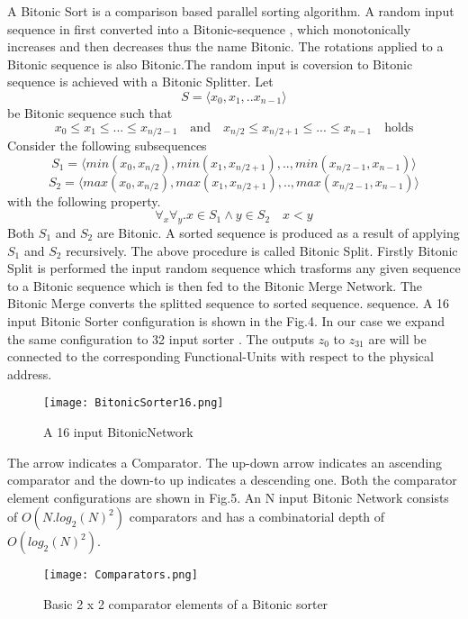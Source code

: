 			    A Bitonic Sort\cite{bitonic_ref} is a comparison based parallel sorting algorithm. A random input sequence in first converted into a Bitonic-sequence , which monotonically increases and then decreases thus the name Bitonic.
			    The rotations applied to a Bitonic sequence is also Bitonic.The random input is coversion to Bitonic sequence is achieved with a Bitonic Splitter.\newline
			    Let \[ 
				  S = \langle x_0,x_1,..x_{n-1}\rangle 
				\] be Bitonic sequence such that
				\[
				    x_0 \leq x_1 \leq ... \leq x_{n/2-1} \quad \textrm{and} \quad  x_{n/2} \leq x_{n/2+1} \leq ... \leq x_{n-1}  \quad \textrm{holds}
				\]
			    Consider the following subsequences
				\[
				  S_{1} =  \langle min(x_0,x_{n/2}), min(x_1,x_{n/2+1}),..,min(x_{n/2-1},x_{n-1})\rangle
				\]
				\[
				  S_{2} =  \langle max(x_0,x_{n/2}), max(x_1,x_{n/2+1}),..,max(x_{n/2-1},x_{n-1})\rangle
				\]
			    with the following property.
				\[
				  \forall _{x} \forall _{y}. x \in S_{1}  \wedge  y \in S_{2} \quad x < y
				\]
			    Both $S_{1}$ and $S_{2}$ are Bitonic. A sorted sequence is produced as a result of applying $S_{1}$ and $S_{2}$ recursively. The above procedure is called Bitonic Split. Firstly Bitonic Split is performed the input random sequence which 
			    trasforms any given sequence to a Bitonic sequence which is then fed to the Bitonic Merge Network. The Bitonic Merge converts the splitted sequence to sorted sequence.
			    sequence. A 16 input Bitonic Sorter configuration is shown in the Fig.4. In our case we expand the same configuration to 32 input sorter . The outputs $z_{0}$ to $z_{31}$ are will
			    be connected to the corresponding Functional-Units with respect to the physical address.
				    \begin{figure}[!ht]
					      \texttt{[image: BitonicSorter16.png]}
					    \caption{A 16 input BitonicNetwork}
				    \end{figure}
			    The arrow indicates a Comparator. The up-down arrow indicates an ascending comparator and the down-to up indicates a descending one. Both the comparator element configurations are shown in Fig.5. An N input Bitonic Network
			    consists of $O(N.log_{2}(N)^{2})$ comparators and has a combinatorial depth of $O(log_{2}(N)^{2})$.
				    \begin{figure}[!ht]
					      \texttt{[image: Comparators.png]}
					    \caption{Basic 2 x 2 comparator elements of a Bitonic sorter}
				    \end{figure}
